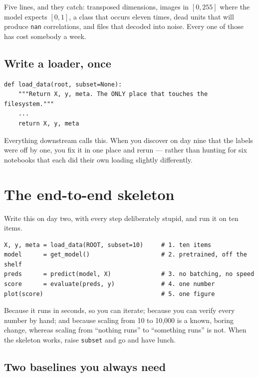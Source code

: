 \documentclass[11pt]{article}
\begin{document}
Five lines, and they catch: transposed dimensions, images in $[0,255]$ where the
model expects $[0,1]$, a class that occurs eleven times, dead units that will
produce \texttt{nan} correlations, and files that decoded into noise. Every one
of those has cost somebody a week.

\subsection{Write a loader, once}

\begin{lstlisting}
def load_data(root, subset=None):
    """Return X, y, meta. The ONLY place that touches the filesystem."""
    ...
    return X, y, meta
\end{lstlisting}

Everything downstream calls this. When you discover on day nine that the labels
were off by one, you fix it in one place and rerun --- rather than hunting for
six notebooks that each did their own loading slightly differently.

\section{The end-to-end skeleton}

Write this on day two, with every step deliberately stupid, and run it on ten
items.

\begin{lstlisting}
X, y, meta = load_data(ROOT, subset=10)     # 1. ten items
model      = get_model()                    # 2. pretrained, off the shelf
preds      = predict(model, X)              # 3. no batching, no speed
score      = evaluate(preds, y)             # 4. one number
plot(score)                                 # 5. one figure
\end{lstlisting}

\begin{keybox}
 Because it runs in seconds, so you can iterate; because
you can verify every number by hand; and because scaling from 10 to 10,000 is a
known, boring change, whereas scaling from ``nothing runs'' to ``something runs''
is not. When the skeleton works, raise \texttt{subset} and go and have lunch.
\end{keybox}

\subsection{Two baselines you always need}
\end{document}

